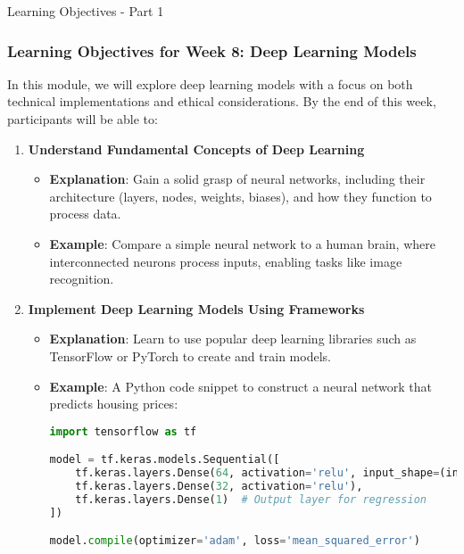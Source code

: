 \documentclass[aspectratio=169]{beamer}
\begin{document}
\begin{frame}[fragile]{Learning Objectives - Part 1}
    \frametitle{Learning Objectives for Week 8: Deep Learning Models}
    In this module, we will explore deep learning models with a focus on both technical implementations and ethical considerations. By the end of this week, participants will be able to:

    \begin{enumerate}
        \item \textbf{Understand Fundamental Concepts of Deep Learning}
        \begin{itemize}
            \item \textbf{Explanation}: Gain a solid grasp of neural networks, including their architecture (layers, nodes, weights, biases), and how they function to process data.
            \item \textbf{Example}: Compare a simple neural network to a human brain, where interconnected neurons process inputs, enabling tasks like image recognition.
        \end{itemize}
        
        \item \textbf{Implement Deep Learning Models Using Frameworks}
        \begin{itemize}
            \item \textbf{Explanation}: Learn to use popular deep learning libraries such as TensorFlow or PyTorch to create and train models.
            \item \textbf{Example}: A Python code snippet to construct a neural network that predicts housing prices:
            \begin{lstlisting}[language=Python]
import tensorflow as tf

model = tf.keras.models.Sequential([
    tf.keras.layers.Dense(64, activation='relu', input_shape=(input_dim, )),
    tf.keras.layers.Dense(32, activation='relu'),
    tf.keras.layers.Dense(1)  # Output layer for regression
])

model.compile(optimizer='adam', loss='mean_squared_error')
            \end{lstlisting}
        \end{itemize}
    \end{enumerate}
\end{frame}
\end{document}
